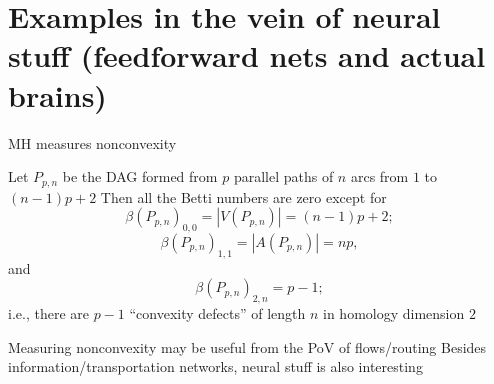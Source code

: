 \documentclass[usenames,dvipsnames,10pt,aspectratio=169]{beamer}
\begin{document}
%



\section{{\bf Examples} in the vein of neural stuff (feedforward nets and actual brains)}


\begin{frame}{MH measures nonconvexity}


\begin{alertblock}{Let $P_{p,n}$ be the DAG formed from $p$ parallel paths of $n$ arcs from $1$ to  $(n-1)p+2$}
Then all the Betti numbers are zero except for $$\beta(P_{p,n})_{0,0} = |V(P_{p,n})| = (n-1)p+2;$$ $$\beta(P_{p,n})_{1,1} = |A(P_{p,n})| = np,$$ and $$\beta(P_{p,n})_{2,n} = p-1;$$ i.e., there are $p-1$ ``convexity defects'' of length $n$ in homology dimension $2$
\end{alertblock}

\begin{block}{Measuring nonconvexity may be useful from the PoV of flows/routing}
Besides information/transportation networks, neural stuff is also interesting
\end{block}


\end{frame}
\end{document}
